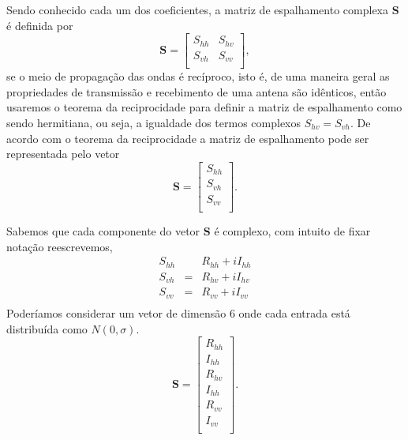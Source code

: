 \documentclass[conference]{IEEEtran}
\begin{document}
Sendo conhecido cada um dos coeficientes, a matriz de espalhamento complexa $\mathbf{S}$ é definida por
\begin{equation}
\mathbf{S} = \left[
\begin{array}{cc}
	S_{hh}   & S_{hv}   \\
	S_{vh}   & S_{vv}   \\
\end{array}
\right],
\end{equation}
se o meio de propagação das ondas é recíproco, isto é, de uma maneira geral as propriedades de transmissão e recebimento de uma antena são idênticos, então usaremos o teorema da reciprocidade \cite{lp} para definir a matriz de espalhamento como sendo hermitiana, ou seja, a igualdade dos termos complexos $S_{hv}=S_{vh}$. De acordo com o teorema da reciprocidade a matriz de espalhamento pode ser representada pelo vetor
\begin{equation}
\mathbf{S} = \left[
\begin{array}{c}
	S_{hh}     \\
    S_{vh}     \\
	S_{vv}     \\
\end{array}
\right].
\end{equation}

Sabemos que cada componente do vetor $\mathbf{S}$ é complexo, com intuito de fixar notação reescrevemos,
\begin{equation}
\begin{array}{ccc}
	S_{hh} && R_{hh} + i I_{hh}    \\
    S_{vh} &=& R_{hv} + i I_{hv}   \\
	S_{vv} &=& R_{vv} + i I_{vv}   \\
\end{array}
\end{equation}
Poderíamos considerar um vetor de dimensão $6$ onde cada entrada está distribuída como $N(0,\sigma)$.
\begin{equation}
\mathbf{S} = \left[
\begin{array}{c}
	R_{hh}     \\
    I_{hh}     \\
	R_{hv}     \\
	I_{hh}     \\
    R_{vv}     \\
	I_{vv}     \\
\end{array}
\right].
\end{equation}
\end{document}

